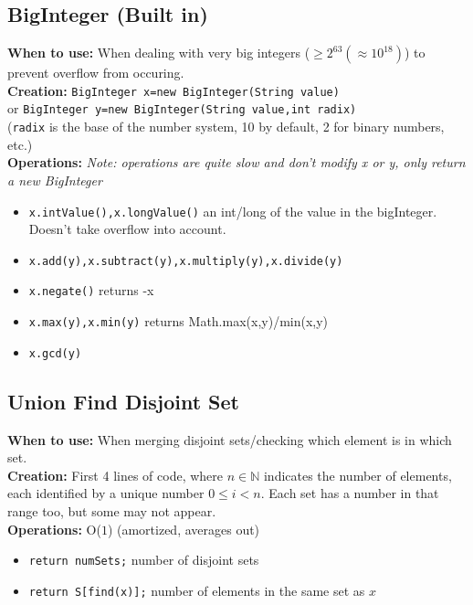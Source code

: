 \documentclass[a4paper,10pt]{article}
\newcommand{\N}{\mathbb{N}}
\begin{document}
\begin{multicols}{2}
\subsection{BigInteger (Built in)}
\textbf{When to use:} When dealing with very big integers ($\geq 2^{63}(\approx 10^{18})$) to prevent overflow from occuring.\\
\textbf{Creation:} \lstinline|BigInteger x=new BigInteger(String value)|\\or \lstinline|BigInteger y=new BigInteger(String value,int radix)|\\(\lstinline|radix| is the base of the number system, 10 by default, 2 for binary numbers, etc.)\\
\textbf{Operations:} \textit{Note: operations are quite slow and don't modify x or y, only return a new BigInteger}
 \begin{itemize}[nolistsep,noitemsep]
\itemsep0em
\item \lstinline|x.intValue(),x.longValue()| an int/long of the value in the bigInteger. Doesn't take overflow into account.
\item \lstinline|x.add(y),x.subtract(y),x.multiply(y),x.divide(y)| 
\item \lstinline|x.negate()| returns -x
\item \lstinline|x.max(y),x.min(y)| returns Math.max(x,y)/min(x,y)
\item \lstinline|x.gcd(y)|
\end{itemize}
\subsection{Union Find Disjoint Set}
\textbf{When to use:} When merging disjoint sets/checking which element is in which set.\\
\textbf{Creation:} First 4 lines of code, where $n\in\N$ indicates the number of elements, each identified by a unique number $0\leq i<n$. Each set has a number in that range too, but some may not appear.\\
\textbf{Operations:} O($1$) (amortized, averages out)
\begin{itemize}[nolistsep,noitemsep]
\itemsep0em
\item \lstinline|return numSets;| number of disjoint sets
\item \lstinline|return S[find(x)];| number of elements in the same set as $x$
\end{itemize}




\end{multicols}
\end{document}
